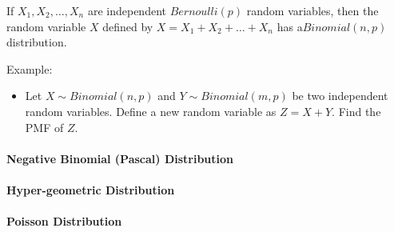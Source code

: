 If $X_1,X_2,\dots,X_n$ are independent $Bernoulli(p)$ random variables, then the random variable $X$ defined by $X=X_1+X_2+\dots+X_n$ has a$Binomial(n,p)$ distribution. 


Example: 
\begin{itemize}
	\item Let $X\sim Binomial(n,p)$ and $Y\sim Binomial(m,p)$ be two independent random variables. Define a new random variable as $Z=X+Y$. Find the PMF of $Z$.
\end{itemize}



\paragraph{Negative Binomial (Pascal) Distribution}
\paragraph{Hyper-geometric Distribution}
\paragraph{Poisson Distribution}


